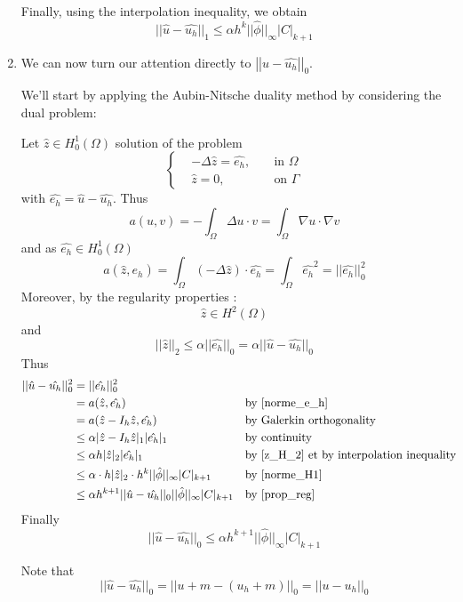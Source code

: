 \begin{enumerate}[label=\textbullet]
	Finally, using the interpolation inequality, we obtain
	\begin{equation}
		||\hat{u}-\hat{u_h}||_1\le\alpha h^k ||\hat{\phi}||_\infty |C|_{k+1}
		\label{norme_H1}
	\end{equation} 

	\item We can now turn our attention directly to $\left|\left|\hat{u}-\hat{u_h}\right|\right|_0$.

	We'll start by applying the Aubin-Nitsche duality method by considering the dual problem:
	
	Let $\hat{z}\in H_0^1(\Omega)$ solution of the problem
	$$\left\{\begin{aligned}
		&-\Delta\hat{z}=\hat{e_h}, \; &&\text{in }\Omega \\
		&\hat{z}=0, \; &&\text{on } \Gamma
	\end{aligned}\right.$$
	with $\hat{e_h}=\hat{u}-\hat{u_h}$.
	Thus
	$$a(u,v)=-\int_\Omega\Delta u\cdot v=\int_\Omega\nabla u\cdot\nabla v$$
	and as $\hat{e_h}\in H_0^1(\Omega)$
	\begin{equation}
		a(\hat{z},\hat{e_h})=\int_\Omega(-\Delta \hat{z})\cdot \hat{e_h}=\int_\Omega \hat{e_h}^2=||\hat{e_h}||_0^2
		\label{norme_e_h}
	\end{equation}
	Moreover, by the regularity properties : 
	\begin{equation}
		\hat{z}\in H^2(\Omega)
		\label{z_H_2}
	\end{equation}
	and
	\begin{equation}
		||\hat{z}||_2\le \alpha||\hat{e_h}||_0 =\alpha||\hat{u}-\hat{u_h}||_0
		\label{prop_reg}
	\end{equation}
	Thus
	\begin{align*}
		||\hat{u}-\hat{u_h}||_0^2&=||\hat{e_h}||_0^2 \\
		&=a(\hat{z},\hat{e_h}) &&\text{by \ref{norme_e_h}} \\
		&=a(\hat{z}-I_h\hat{z},\hat{e_h}) &&\text{by Galerkin orthogonality} \\
		&\le\alpha|\hat{z}-I_h\hat{z}|_1|\hat{e_h}|_1 &&\text{by continuity} \\
		&\le\alpha h|\hat{z}|_2|\hat{e_h}|_1 &&\text{by \ref{z_H_2} et by interpolation inequality} \\
		&\le\alpha \cdot h|\hat{z}|_2 \cdot h^k||\hat{\phi}||_\infty |C|_{k+1} &&\text{by \ref{norme_H1}} \\
		&\le\alpha h^{k+1}||\hat{u}-\hat{u_h}||_0||\hat{\phi}||_\infty |C|_{k+1} &&\text{by \ref{prop_reg}}
	\end{align*}
	Finally
	\begin{equation*}
		||\hat{u}-\hat{u_h}||_0\le\alpha h^{k+1}||\hat{\phi}||_\infty |C|_{k+1}
	\end{equation*}
	
	\begin{Rem}
		Note that 
		\begin{equation*}
			||\hat{u}-\hat{u_h}||_0=||u+m-(u_h+m)||_0=||u-u_h||_0
		\end{equation*}
	\end{Rem}
\end{enumerate}

